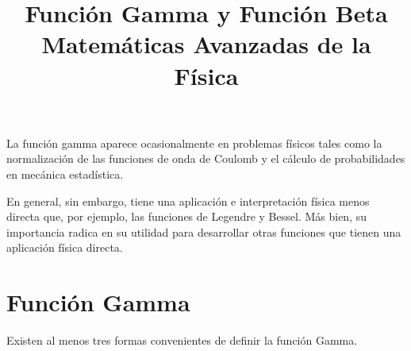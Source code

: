 
\usepackage{mathrsfs}
\usepackage{bigints}
\title{Función Gamma y Función Beta \\ {\large Matemáticas Avanzadas de la Física}}
\date{ }

\renewcommand\labelenumii{\theenumi.{\arabic{enumii}}}
\maketitle
\fontsize{14}{14}\selectfont
La función gamma aparece ocasionalmente en problemas físicos tales como la normalización de las funciones de onda de Coulomb y el cálculo de probabilidades en mecánica estadística.
\par
En general, sin embargo, tiene una aplicación e interpretación física menos directa que, por ejemplo, las funciones de Legendre y Bessel. Más bien, su importancia radica en su utilidad para desarrollar otras funciones que tienen una aplicación física directa.
\section{Función Gamma}
Existen al menos tres formas convenientes de definir la función Gamma.
